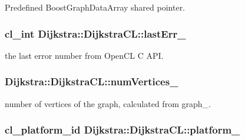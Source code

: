 Predefined BoostGraphData\+Array shared pointer.

\hypertarget{class_dijkstra_1_1_dijkstra_c_l_aa4eec2b97cdd4a59fd814035736f0137}{
\subsubsection[{last\+Err\+\_\+}]{\setlength{\rightskip}{0pt plus 5cm}cl\+\_\+int Dijkstra\+::\+Dijkstra\+C\+L\+::last\+Err\+\_\+\hspace{0.3cm}{\ttfamily [private]}}}\label{class_dijkstra_1_1_dijkstra_c_l_aa4eec2b97cdd4a59fd814035736f0137}


the last error number from Open\+C\+L C A\+P\+I. 

\hypertarget{class_dijkstra_1_1_dijkstra_c_l_a282256a0fd3793379edae35783130833}{
\subsubsection[{num\+Vertices\+\_\+}]{ Dijkstra\+::\+Dijkstra\+C\+L\+::num\+Vertices\+\_\+\hspace{0.3cm}{\ttfamily [private]}}}\label{class_dijkstra_1_1_dijkstra_c_l_a282256a0fd3793379edae35783130833}


number of vertices of the graph, calculated from graph\+\_\+. 

\hypertarget{class_dijkstra_1_1_dijkstra_c_l_a48fb6896749198f8ecca726b887bac86}{
\subsubsection[{platform\+\_\+}]{\setlength{\rightskip}{0pt plus 5cm}cl\+\_\+platform\+\_\+id Dijkstra\+::\+Dijkstra\+C\+L\+::platform\+\_\+\hspace{0.3cm}{\ttfamily [private]}}}\label{class_dijkstra_1_1_dijkstra_c_l_a48fb6896749198f8ecca726b887bac86}


